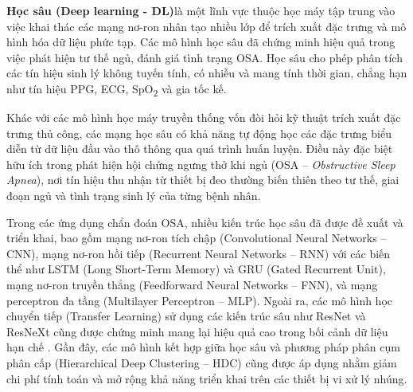 \textbf{Học sâu (Deep learning - DL)}là một lĩnh vực thuộc học máy
tập trung vào việc khai thác các mạng nơ-ron nhân tạo nhiều lớp để
trích xuất đặc trưng và mô hình hóa dữ liệu phức tạp. Các mô hình học
sâu đã chứng minh hiệu quả trong việc phát hiện tư thế ngủ, đánh giá tình trạng OSA.
Học sâu cho phép phân tích các tín hiệu sinh lý không tuyến tính,
có nhiễu và mang tính thời gian, chẳng hạn như tín hiệu PPG, ECG,
SpO\textsubscript{2} và gia tốc kế.

Khác với các mô hình học máy truyền thống vốn đòi hỏi kỹ thuật trích xuất đặc
trưng thủ công, các mạng học sâu có khả năng tự động học các đặc trưng biểu
diễn từ dữ liệu đầu vào thô thông qua quá trình huấn luyện. Điều này đặc biệt
hữu ích trong phát hiện hội chứng ngưng thở khi ngủ (OSA – \textit{Obstructive
  Sleep Apnea}), nơi tín hiệu thu nhận từ thiết bị đeo thường biến thiên theo tư
thế, giai đoạn ngủ và tình trạng sinh lý của từng bệnh nhân.

Trong các ứng dụng chẩn đoán OSA, nhiều kiến trúc học sâu đã được đề xuất và
triển khai, bao gồm mạng nơ-ron tích chập (Convolutional Neural Networks –
CNN), mạng nơ-ron hồi tiếp (Recurrent Neural Networks – RNN) với các biến thể
như LSTM (Long Short-Term Memory) và GRU (Gated Recurrent Unit), mạng nơ-ron
truyền thẳng (Feedforward Neural Networks – FNN), và mạng perceptron đa tầng
(Multilayer Perceptron – MLP). Ngoài ra, các mô hình học chuyển tiếp (Transfer
Learning) sử dụng các kiến trúc sâu như ResNet và ResNeXt cũng được chứng minh
mang lại hiệu quả cao trong bối cảnh dữ liệu hạn chế \cite{osa_sanchez2025,
  wang2023ml_wearable, rossi2023sleep, olsen2024transfer}. Gần đây, các mô hình
kết hợp giữa học sâu và phương pháp phân cụm phân cấp (Hierarchical Deep
Clustering – HDC) cũng được áp dụng nhằm giảm chi phí tính toán và mở rộng khả
năng triển khai trên các thiết bị vi xử lý nhúng.

